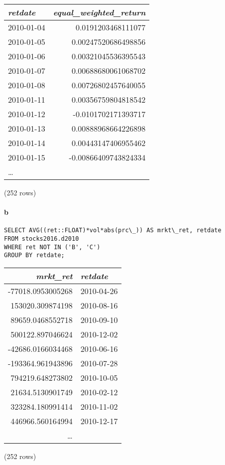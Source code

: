 \documentclass[]{article}
\let\oldparagraph\paragraph
\renewcommand{\paragraph}[1]{\oldparagraph{#1}\mbox{}}
\begin{document}
\begin{center}
\begin{tabular}{l | r}
\textit{retdate} & \textit{equal\_weighted\_return} \\
\hline
2010-01-04 & 0.0191203468111077 \\
2010-01-05 & 0.00247520686498856 \\
2010-01-06 & 0.00321045536395543 \\
2010-01-07 & 0.00688680061068702 \\
2010-01-08 & 0.00726802457640055 \\
2010-01-11 & 0.00356759804818542 \\
2010-01-12 & -0.0101702171393717 \\
2010-01-13 & 0.00888968664226898 \\
2010-01-14 & 0.00443147406955462 \\
2010-01-15 & -0.00866409743824334 \\
\ldots\\
\end{tabular}

\noindent (252 rows) \\
\end{center}

\paragraph{b}

\color{blue}
\begin{verbatim}
SELECT AVG((ret::FLOAT)*vol*abs(prc\_)) AS mrkt\_ret, retdate
FROM stocks2016.d2010
WHERE ret NOT IN ('B', 'C')
GROUP BY retdate;
\end{verbatim}
\color{black}

\begin{center}
\begin{tabular}{r | l}
\textit{mrkt\_ret} & \textit{retdate} \\
\hline
-77018.0953005268 & 2010-04-26 \\
153020.309874198 & 2010-08-16 \\
89659.0468552718 & 2010-09-10 \\
500122.897046624 & 2010-12-02 \\
-42686.0166034468 & 2010-06-16 \\
-193364.961943896 & 2010-07-28 \\
794219.648273802 & 2010-10-05 \\
21634.5130901749 & 2010-02-12 \\
323284.180991414 & 2010-11-02 \\
446966.560164994 & 2010-12-17 \\
\ldots\\
\end{tabular}

\noindent (252 rows) \\
\end{center}
\end{document}
